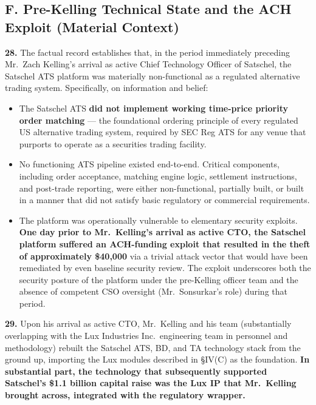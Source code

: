 \documentclass[11pt,letterpaper]{article}
\begin{document}
\subsection*{F. Pre-Kelling Technical State and the ACH Exploit (Material Context)}

\textbf{28.} The factual record establishes that, in the period
immediately preceding Mr.\ Zach Kelling's arrival as active Chief
Technology Officer of Satschel, the Satschel ATS platform was
materially non-functional as a regulated alternative trading system.
Specifically, on information and belief:

\begin{itemize}[leftmargin=2em,itemsep=0.1em]
\item The Satschel ATS \textbf{did not implement working time-price
priority order matching} --- the foundational ordering principle of
every regulated US alternative trading system, required by SEC Reg
ATS for any venue that purports to operate as a securities trading
facility.
\item No functioning ATS pipeline existed end-to-end. Critical
components, including order acceptance, matching engine logic,
settlement instructions, and post-trade reporting, were either
non-functional, partially built, or built in a manner that did not
satisfy basic regulatory or commercial requirements.
\item The platform was operationally vulnerable to elementary
security exploits. \textbf{One day prior to Mr.\ Kelling's arrival as
active CTO, the Satschel platform suffered an ACH-funding exploit
that resulted in the theft of approximately \$40,000} via a trivial
attack vector that would have been remediated by even baseline
security review. The exploit underscores both the security posture
of the platform under the pre-Kelling officer team and the absence
of competent CSO oversight (Mr.\ Sonsurkar's role) during that
period.
\end{itemize}

\textbf{29.} Upon his arrival as active CTO, Mr.\ Kelling and his
team (substantially overlapping with the Lux Industries Inc.\
engineering team in personnel and methodology) rebuilt the Satschel
ATS, BD, and TA technology stack from the ground up, importing the
Lux modules described in \S IV(C) as the foundation. \textbf{In
substantial part, the technology that subsequently supported
Satschel's \$1.1 billion capital raise was the Lux IP that Mr.\
Kelling brought across, integrated with the regulatory wrapper.}
\end{document}
